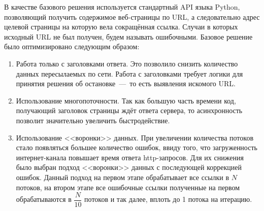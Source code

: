         В качестве базового решения используется стандартный API языка Python, позволяющий получить содержимое веб-страницы по URL,
        а следовательно адрес целевой страницы на которую вела сокращённая ссылка. Случаи в которых исходный URL не был получен, будем называть ошибочными.
        Базовое решение было оптимизировано следующим образом:
        \begin{enumerate}
            \item Работа только с заголовками ответа. Это позволило снизить количество данных пересылаемых по сети.
            Работа с заголовками требует логики для принятия решения об остановке~---~то есть выявления искомого URL.
            \item Использование многопоточности.
            Так как большую часть времени код, получающий заголовок страницы ждёт ответа сервера, то асинхронность позволит значительно увеличить быстродействие.
            \item Использование <<воронки>> данных. При увеличении количества потоков стало появляться большее количество ошибок,
            ввиду того, что загруженность интернет-канала повышает время ответа http-запросов.
            Для их снижения было выбран подход <<воронки>> данных с последующей коррекцией ошибок. Данный подход на первом этапе обрабатывает все ссылки в $N$ потоков,
            на втором этапе все ошибочные ссылки полученные на первом обрабатываются в $\dfrac{N}{10}$ потоков и так далее, вплоть до 1 потока на итерацию.
        \end{enumerate}
%


